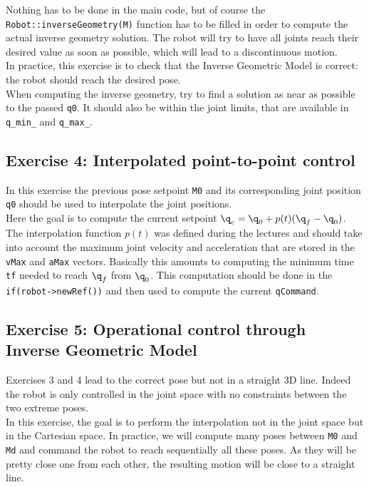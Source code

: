 \documentclass{ecnreport}
\begin{document}
Nothing has to be done in the main code, but of course the \texttt{Robot::inverseGeometry(M)} function has to be filled in order to compute the actual inverse geometry solution. The robot will try to have all joints reach their desired value as soon as possible, which will lead to a discontinuous motion.\\

In practice, this exercise is to check that the Inverse Geometric Model is correct: the robot should reach the desired pose.\\

When computing the inverse geometry, try to find a solution as near as possible to the passed \texttt{q0}. It should also be within the joint limits, that are available in \texttt{q\_min\_} and \texttt{q\_max\_}.

\subsection*{Exercise 4: Interpolated point-to-point control}

In this exercise the previous pose setpoint \texttt{M0} and its corresponding joint position \texttt{q0} should be used to interpolate the joint positions.\\

Here the goal is to compute the current setpoint $\q_c = \q_0 + p(t)(\q_f-\q_0)$. The interpolation function $p(t)$ was defined during the lectures and should take into account the maximum joint velocity and acceleration that are stored in the \texttt{vMax} and \texttt{aMax} vectors. Basically this amounts to computing the minimum time \texttt{tf} needed to reach $\q_f$ from $\q_0$. This computation should be done in the \texttt{if(robot->newRef())} and then used to compute the current \texttt{qCommand}.


\subsection*{Exercise 5: Operational control through Inverse Geometric Model}

Exercises 3 and 4 lead to the correct pose but not in a straight 3D line. Indeed the robot is only controlled in the joint space with no constraints between the two extreme poses.\\
In this exercise, the goal is to perform the interpolation not in the joint space but in the Cartesian space. In practice, we will compute many poses between 
\texttt{M0} and \texttt{Md} and command the robot to reach sequentially all these poses. As they will be pretty close one from each other, the resulting motion 
will be close to a straight line.
\end{document}
